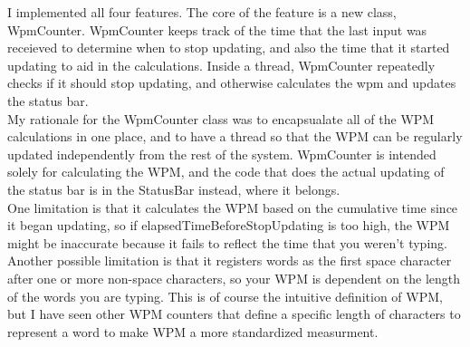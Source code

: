 \documentclass[12pt]{article}
\begin{document}
\maketitle

I implemented all four features.
The core of the feature is a new class, WpmCounter. WpmCounter keeps track
of the time that the last input was receieved to determine when to stop
updating, and also the time that it started updating to aid in the
calculations. Inside a thread, WpmCounter repeatedly checks if it should stop
updating, and otherwise calculates the wpm and updates the status bar. \\

My rationale for the WpmCounter class was to encapsualate all of the WPM
calculations in one place, and to have a thread so that the WPM can be
regularly updated independently from the rest of the system. WpmCounter is
intended solely for calculating the WPM, and the code that does the actual
updating of the status bar is in the StatusBar instead, where it belongs. \\

One limitation is that it calculates the WPM based on the cumulative time
since it began updating, so if elapsedTimeBeforeStopUpdating is too high, the
WPM might be inaccurate because it fails to reflect the time that you weren't
typing. Another possible limitation is that it registers words as the first
space character after one or more non-space characters, so your WPM is
dependent on the length of the words you are typing. This is of course the
intuitive definition of WPM, but I have seen other WPM counters that define
a specific length of characters to represent a word to make WPM a more
standardized measurment. \\
\end{document}
